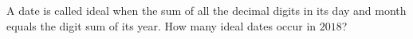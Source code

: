A date is called ideal when the sum of all the decimal digits in its day and month equals the digit sum of its year. How many ideal dates occur in $2018$?
